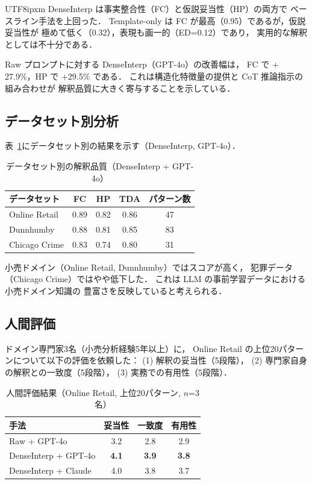\documentclass[conference]{IEEEtran}
\begin{document}
\begin{CJK}{UTF8}{ipxm}
DenseInterp は事実整合性（FC）と仮説妥当性（HP）の両方で
ベースライン手法を上回った．
Template-only は FC が最高（0.95）であるが，仮説妥当性が
極めて低く（0.32），表現も画一的（ED=0.12）であり，
実用的な解釈としては不十分である．

Raw プロンプトに対する DenseInterp（GPT-4o）の改善幅は，
FC で $+$27.9\%，HP で $+$29.5\% である．
これは構造化特徴量の提供と CoT 推論指示の組み合わせが
解釈品質に大きく寄与することを示している．

\subsection{データセット別分析}

表~\ref{tab:per_dataset}にデータセット別の結果を示す（DenseInterp, GPT-4o）．

\begin{table}[t]
\centering
\caption{データセット別の解釈品質（DenseInterp + GPT-4o）}
\label{tab:per_dataset}
\begin{tabular}{lcccc}
\toprule
データセット & FC & HP & TDA & パターン数 \\
\midrule
Online Retail & 0.89 & 0.82 & 0.86 & 47 \\
Dunnhumby     & 0.88 & 0.81 & 0.85 & 83 \\
Chicago Crime & 0.83 & 0.74 & 0.80 & 31 \\
\bottomrule
\end{tabular}
\end{table}

小売ドメイン（Online Retail, Dunnhumby）ではスコアが高く，
犯罪データ（Chicago Crime）ではやや低下した．
これは LLM の事前学習データにおける小売ドメイン知識の
豊富さを反映していると考えられる．

\subsection{人間評価}

ドメイン専門家3名（小売分析経験5年以上）に，
Online Retail の上位20パターンについて以下の評価を依頼した：
(1) 解釈の妥当性（5段階），
(2) 専門家自身の解釈との一致度（5段階），
(3) 実務での有用性（5段階）．

\begin{table}[t]
\centering
\caption{人間評価結果（Online Retail, 上位20パターン, $n$=3名）}
\label{tab:human_eval}
\begin{tabular}{lccc}
\toprule
手法 & 妥当性 & 一致度 & 有用性 \\
\midrule
Raw + GPT-4o & 3.2 & 2.8 & 2.9 \\
DenseInterp + GPT-4o & \textbf{4.1} & \textbf{3.9} & \textbf{3.8} \\
DenseInterp + Claude & 4.0 & 3.8 & 3.7 \\
\bottomrule
\end{tabular}
\end{table}


\end{CJK}
\end{document}

